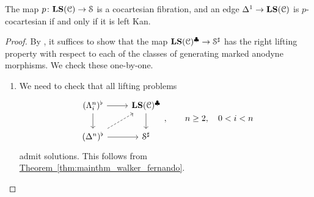 \documentclass[main.tex]{subfiles}
\begin{document}
\begin{theorem}
  \label{thm:cocartesian_edges_of_p}
  The map $p\colon \mathbf{LS}(\mathcal{C}) \to \mathcal{S}$ is a cocartesian fibration, and an edge $\Delta^{1} \to \mathbf{LS}(\mathcal{C})$ is $p$-cocartesian if and only if it is left Kan.
\end{theorem}
\begin{proof}
  By \cite[Prop.~3.1.1.6]{highertopostheory}, it suffices to show that the map $\mathbf{LS}(\mathcal{C})^{\clubsuit} \to \mathcal{S}^{\sharp}$ has the right lifting property with respect to each of the classes of generating marked anodyne morphisms. We check these one-by-one.
  \begin{enumerate}
    \item We need to check that all lifting problems
      \begin{equation*}
        \begin{tikzcd}
          (\Lambda^{n}_{i})^{\flat}
          \arrow[r]
          \arrow[d]
          & \LS(\category{C})^{\clubsuit}
          \arrow[d]
          \\
          (\Delta^{n})^{\flat}
          \arrow[r]
          \arrow[ur, dashed]
          & \S^{\sharp}
        \end{tikzcd},\qquad n \geq 2, \quad 0 < i < n
      \end{equation*}
      admit solutions. This follows from \hyperref[thm:mainthm_walker_fernando]{Theorem~\ref*{thm:mainthm_walker_fernando}}.


\end{enumerate}
\end{proof}
\end{document}

